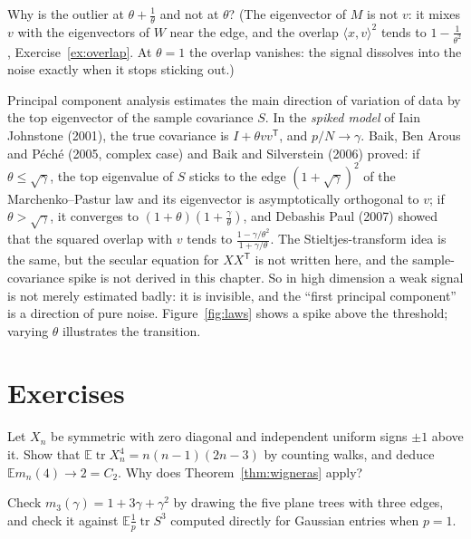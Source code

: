 \begin{think}
Why is the outlier at $\theta+\frac1\theta$ and not at $\theta$? (The eigenvector of $M$ is not $v$: it mixes $v$ with the eigenvectors of $W$ near the edge, and the overlap $\langle x,v\rangle^2$ tends to $1-\frac1{\theta^2}$, Exercise~\ref{ex:overlap}. At
$\theta=1$ the overlap vanishes: the signal dissolves into the noise exactly when it stops sticking out.)
\end{think}

\begin{remark}
Principal component analysis estimates the main direction of variation of data by the top eigenvector of the sample covariance $S$. In the \emph{spiked model} of Iain Johnstone (2001), the true covariance is $I+\theta vv^{\mathsf T}$, and
$p/N\to\gamma$. Baik, Ben Arous and P\'ech\'e (2005, complex case) and Baik and Silverstein (2006) proved: if $\theta\le\sqrt\gamma$, the top eigenvalue of $S$ sticks to the edge $(1+\sqrt\gamma)^2$ of the Marchenko--Pastur law and its
eigenvector is asymptotically orthogonal to $v$; if $\theta>\sqrt\gamma$, it converges to $(1+\theta)(1+\frac\gamma\theta)$, and Debashis Paul (2007) showed that the squared overlap with $v$ tends to
$\frac{1-\gamma/\theta^2}{1+\gamma/\theta}$. The Stieltjes-transform idea is the same, but the secular equation for $XX^{\mathsf T}$ is not written here, and the sample-covariance spike is not derived in this chapter. So in high dimension a weak signal is not merely estimated badly: it is invisible, and the
``first principal component'' is a direction of pure noise. Figure~\ref{fig:laws} shows a spike above the threshold; varying $\theta$ illustrates the transition.
\end{remark}

\section{Exercises}

\begin{exercise}[$\star$]\label{ex:pmone}
Let $X_n$ be symmetric with zero diagonal and independent uniform signs $\pm1$ above it. Show that $\mathbb E\operatorname{tr}X_n^4=n(n-1)(2n-3)$ by counting walks, and deduce $\mathbb Em_n(4)\to2=C_2$. Why does Theorem~\ref{thm:wigneras} apply?
\end{exercise}

\begin{exercise}[$\star$]\label{ex:mpsmall}
Check $m_3(\gamma)=1+3\gamma+\gamma^2$ by drawing the five plane trees with three edges, and check it against $\mathbb E\frac1p\operatorname{tr}S^3$ computed directly for Gaussian entries when $p=1$.
\end{exercise}

